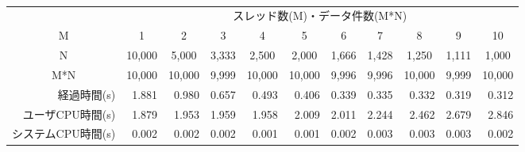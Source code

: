 \documentclass[dvipdfmx]{standalone}
\begin{document}
\tt\footnotesize
\begin{tabular}{r | r r r r r r r r r r}
\multicolumn{1}{c}{}&\multicolumn{10}{c}{スレッド数(M)・データ件数(M*N)}\\
\multicolumn{1}{c|}{M}&\multicolumn{1}{c}{1}&\multicolumn{1}{c}{2}&
\multicolumn{1}{c}{3}&\multicolumn{1}{c}{4}&\multicolumn{1}{c}{5}&
\multicolumn{1}{c}{6}&\multicolumn{1}{c}{7}&\multicolumn{1}{c}{8}&
\multicolumn{1}{c}{9}&\multicolumn{1}{c}{10}\\
\multicolumn{1}{c|}{N}&\multicolumn{1}{c}{10,000}&\multicolumn{1}{c}{5,000}&
\multicolumn{1}{c}{3,333}&\multicolumn{1}{c}{2,500}&\multicolumn{1}{c}{2,000}&
\multicolumn{1}{c}{1,666}&\multicolumn{1}{c}{1,428}&\multicolumn{1}{c}{1,250}&
\multicolumn{1}{c}{1,111}&\multicolumn{1}{c}{1,000}\\
\multicolumn{1}{c|}{M*N}&\multicolumn{1}{c}{10,000}&\multicolumn{1}{c}{10,000}&
\multicolumn{1}{c}{9,999}&\multicolumn{1}{c}{10,000}&
\multicolumn{1}{c}{10,000}&\multicolumn{1}{c}{9,996}&
\multicolumn{1}{c}{9,996}&\multicolumn{1}{c}{10,000}&
\multicolumn{1}{c}{9,999}&\multicolumn{1}{c}{10,000}\\
\hline
経過時間(s)        & 1.881 & 0.980 & 0.657 & 0.493 & 0.406 
                   & 0.339 & 0.335 & 0.332 & 0.319 & 0.312 \\
ユーザCPU時間(s)   & 1.879 & 1.953 & 1.959 & 1.958 & 2.009
                   & 2.011 & 2.244 & 2.462 & 2.679 & 2.846 \\
システムCPU時間(s) & 0.002 & 0.002 & 0.002 & 0.001 & 0.001
                   & 0.002 & 0.003 & 0.003 & 0.003 & 0.002 \\
\end{tabular}~
\end{document}
